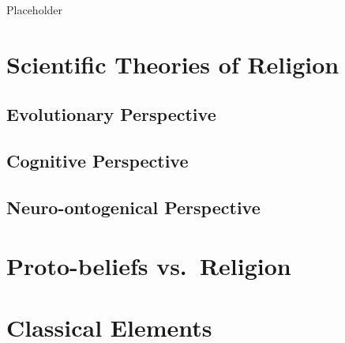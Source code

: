 \documentclass[
]{book}
\begin{document}
Placeholder

\hypertarget{scientific-theories-of-religion}{%
\section{Scientific Theories of Religion}\label{scientific-theories-of-religion}}

\hypertarget{evolutionary-perspective}{%
\subsection{Evolutionary Perspective}\label{evolutionary-perspective}}

\hypertarget{cognitive-perspective}{%
\subsection{Cognitive Perspective}\label{cognitive-perspective}}

\hypertarget{neuro-ontogenical-perspective}{%
\subsection{Neuro-ontogenical Perspective}\label{neuro-ontogenical-perspective}}

\hypertarget{proto-beliefs-vs.-religion}{%
\section{Proto-beliefs vs.~Religion}\label{proto-beliefs-vs.-religion}}

\hypertarget{classical-elements}{%
\section{Classical Elements}\label{classical-elements}}

  
\end{document}
